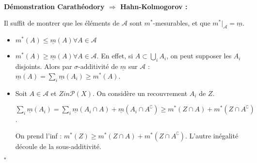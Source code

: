 \documentclass[10pt,a4paper,notitlepage ]{report}
\newcommand{\comp}[1]{#1^\complement}
\newcounter{th}
\newenvironment{demo}[1][]{

	\textbf{Démonstration #1 :}
}{\begin{flushright}
	$\square$
\end{flushright}
}
\begin{document}
\begin{demo}[Carathéodory $\Rightarrow$ Hahn-Kolmogorov]
	
	Il suffit de montrer que les éléments de $\mathcal A$ sont $m^*$-mesurables, et que $m^*|_{\mathcal A} = \underline m$.
	\begin{itemize}
		\item $m^*(A) \le \underline m(A) \forall A \in \mathcal A$
		\item $m^*(A) \ge \underline m (A) \forall A \in \mathcal A$. En effet, si $A \subset \underset i \bigcup A_i$, on peut supposer les $A_i$ disjoints. Alors par $\sigma$-additivité de $\underline m$ sur $\mathcal A$ : $\underline m(A) = \underset i \sum \underline m(A_i) \ge m^*(A)$.
		\item Soit $A \in \mathcal A$ et $Zin \mathcal P(X)$. On considère un recouvrement $A_i$ de $Z$.
		
		$\underset i \sum \underline m(A_i) = \underset i \sum \underline m (A_i \cap A) + \underline m(A_i \cap \comp A) \ge m^*(Z \cap A) + m^*(Z \cap \comp A)$.
		
		On prend l'inf : $m^*(Z) \ge m^*(Z \cap A) + m^*(Z \cap \comp A)$. L'autre inégalité découle de la sous-additivité.
	\end{itemize}
\end{demo}
\end{document}
